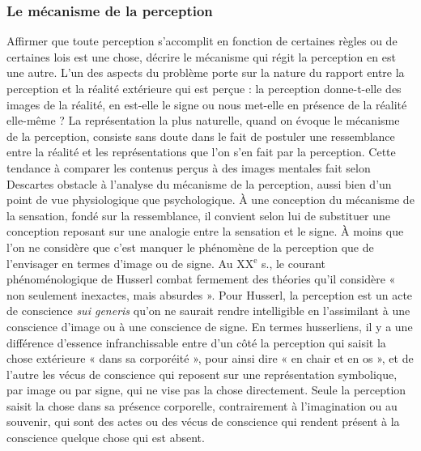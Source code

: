 \subsubsection{Le mécanisme de la perception}

Affirmer que toute perception s’accomplit
en fonction de certaines règles ou de
certaines lois est une chose, décrire le
mécanisme qui régit la perception en est
une autre. L’un des aspects du problème
porte sur la nature du rapport entre la
perception et la réalité extérieure qui est
perçue : la perception donne-t-elle des
images de la réalité, en est-elle le signe ou
nous met-elle en présence de la réalité
elle-même ? La représentation la plus
naturelle, quand on évoque le mécanisme
de la perception, consiste sans doute dans
le fait de postuler une ressemblance entre
la réalité et les représentations que l’on
s’en fait par la perception. Cette tendance
à comparer les contenus perçus à des
images mentales fait selon Descartes obstacle
à l'analyse du mécanisme de la perception,
aussi bien d’un point de vue
physiologique que psychologique. À une
conception du mécanisme de la sensation,
fondé sur la ressemblance, il convient
selon lui de substituer une conception
reposant sur une analogie entre la sensation
et le signe. À moins que l’on ne
considère que c’est manquer le phénomène
de la perception que de l’envisager
en termes d’image ou de signe. Au {\footnotesize XX}$^\text{e}$ s.,
le courant phénoménologique de Husserl
combat fermement des théories qu’il
considère « non seulement inexactes, mais
absurdes ». Pour Husserl, la perception
est un acte de conscience {\it sui generis} qu’on
ne saurait rendre intelligible en l’assimilant
à une conscience d'image ou à une
conscience de signe. En termes husserliens,
il y a une différence d’essence
infranchissable entre d’un côté la perception
qui saisit la chose extérieure « dans
sa corporéité », pour ainsi dire « en chair
et en os », et de l’autre les vécus de
conscience qui reposent sur une représentation
symbolique, par image ou par
signe, qui ne vise pas la chose directement.
Seule la perception saisit la chose
dans sa présence corporelle, contrairement
à l’imagination ou au souvenir, qui
sont des actes ou des vécus de conscience
qui rendent présent à la conscience
quelque chose qui est absent.

